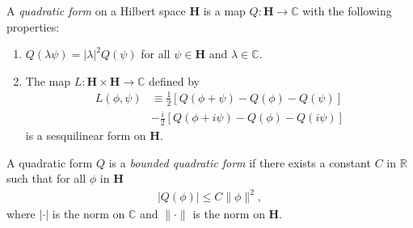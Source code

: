 \begin{definition}
    \label{def:bounded-quadratic-form}
    A \textit{quadratic form} on a Hilbert space $\mathbf{H}$ is a map $Q : \mathbf{H} \rightarrow \mathbb{C}$ with the following properties:
    \begin{enumerate}
        \item $Q(\lambda\psi) = |\lambda|^2 Q(\psi)$ for all $\psi \in \mathbf{H}$ and $\lambda \in \mathbb{C}$.
        \item The map $L : \mathbf{H} \times \mathbf{H} \rightarrow \mathbb{C}$ defined by
            \begin{align}
                L(\phi, \psi) &\equiv \frac{1}{2} \left[ Q(\phi + \psi) - Q(\phi) - Q(\psi) \right] \\
                              &-\frac{i}{2} \left[ Q(\phi + i\psi) - Q(\phi) - Q(i\psi) \right]
            \end{align}
            is a sesquilinear form on $\mathbf{H}$.
    \end{enumerate}
    A quadratic form $Q$ is a \textit{bounded quadratic form} if there exists a constant $C$ in $\mathbb{R}$ such that for all $\phi$ in $\mathbf{H}$
    \begin{align}
        |Q(\phi)| \le C \|\phi\|^2,
    \end{align}
    where $|\cdot|$ is the norm on $\mathbb{C}$ and $\|\cdot\|$ is the norm on $\mathbf{H}$.
\end{definition}

